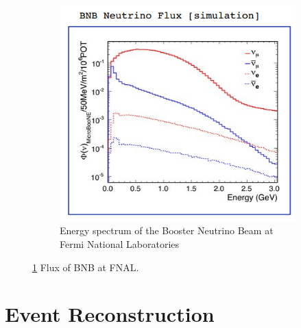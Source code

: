 \begin{figure}[htp!]
\begin{subfigure}[b]{.4\textwidth}
	\includegraphics[width=\textwidth]{figs/bnbflux.png}
	\caption{Energy spectrum of the Booster Neutrino Beam at Fermi National Laboratories}
	\label{fig:bnbflux}
	\end{subfigure}
	\quad
\label{fig:figures}
\caption{\ref{fig:bnbflux} Flux of BNB at FNAL.}
\end{figure}

\section{Event Reconstruction}
